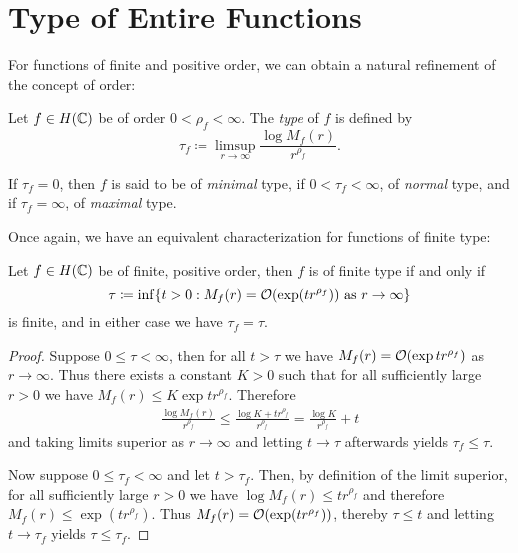 \section{Type of Entire Functions} \label{sec:type}

For functions of finite and positive order, we can obtain a natural refinement of the concept of order:

\begin{definition}
    Let $f \in H(\mathbb{C})$ be of order $0 < \rho_f < \infty$. The \emph{type} of $f$ is defined by
    \begin{equation} \label{eq:def-type}
        \tau_f \coloneqq \limsup_{r \to \infty} \frac{\log M_f(r)}{r^{\rho_f}}.
    \end{equation}

    If $\tau_f = 0$, then $f$ is said to be of \emph{minimal} type, if $0 < \tau_f < \infty$, of \emph{normal} type, and if $\tau_f = \infty$, of \emph{maximal} type.
\end{definition}

Once again, we have an equivalent characterization for functions of finite type:

\begin{proposition} \label{prop:type-infimum}
    Let $f \in H(\mathbb{C})$ be of finite, positive order, then $f$ is of finite type if and only if
    \begin{equation}
        \tau \coloneqq \inf \{ t > 0 : M_f(r) = \mathcal{O}(\exp (t r^{\rho_f})) \textrm{ as } r \to \infty \}
    \end{equation}
    is finite, and in either case we have $\tau_f = \tau$.
\end{proposition}

\begin{proof}
    Suppose $0 \leq \tau < \infty$, then for all $t > \tau$ we have $M_f(r) = \mathcal{O}(\exp t r^{\rho_f})$ as $r \to \infty$. Thus there exists a constant $K > 0$ such that for all sufficiently large $r > 0$ we have $M_f(r) \leq K \exp t r^{\rho_f}$. Therefore
    \begin{align*}
        \frac{\log M_f(r)}{r^{\rho_f}} \leq \frac{\log K + t r^{\rho_f}}{r^{\rho_f}} = \frac{\log K}{r^{\rho_f}} + t
    \end{align*}
    and taking limits superior as $r \to \infty$ and letting $t \to \tau$ afterwards yields $\tau_f \leq \tau$.

    Now suppose $0 \leq \tau_f < \infty$ and let $t > \tau_f$. Then, by definition of the limit superior, for all sufficiently large $r > 0$ we have $ \log M_f(r) \leq t r^{\rho_f}$ and therefore $M_f(r) \leq \exp(t r^{\rho_f})$. Thus $M_f(r) = \mathcal{O}(\exp (t r^{\rho_f}))$, thereby $\tau \leq t$ and letting $t \to \tau_f$ yields $\tau \leq \tau_f$.
\end{proof}

